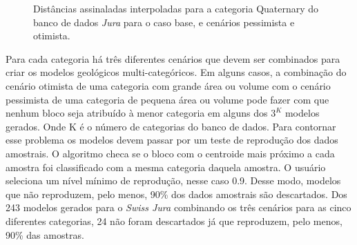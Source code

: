 \begin{figure}[H] 
    \centering
    \caption{Distâncias assinaladas interpoladas para a categoria Quaternary do banco de dados \textit{Jura} para o caso base, e cenários pessimista e otimista.} \label{quater_param}
     \hspace{1em}
     \hspace{1em}
\end{figure}

Para cada categoria há três diferentes cenários que devem ser combinados para criar os modelos geológicos multi-categóricos. Em alguns casos, a combinação do cenário otimista de uma categoria com grande área ou volume com o cenário pessimista de uma categoria de pequena área ou volume pode fazer com que nenhum bloco seja atribuído à menor categoria em alguns dos $3^K$ modelos gerados. Onde K é o número de categorias do banco de dados.  
Para contornar esse problema os modelos devem passar por um teste de reprodução dos dados amostrais. O algoritmo checa se o bloco com o centroide mais próximo a cada amostra foi classificado com a mesma categoria daquela amostra. O usuário seleciona um nível mínimo de reprodução, nesse caso 0.9. Desse modo, modelos que não reproduzem, pelo menos, 90\% dos dados amostrais são descartados. Dos 243 modelos gerados para o \textit{Swiss Jura} combinando os três cenários para as cinco diferentes categorias, 24 não foram descartados já que reproduzem, pelo menos, 90\% das amostras. 

